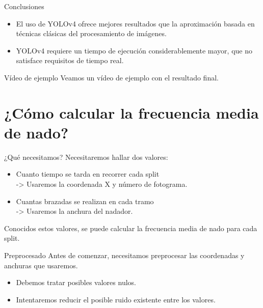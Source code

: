 \documentclass[11pt]{beamer}
\begin{document}
        \begin{frame}{Conclusiones}
            \begin{itemize}
                \item El uso de YOLOv4 ofrece mejores resultados que la aproximación basada en técnicas clásicas del procesamiento de imágenes.
                \item YOLOv4 requiere un tiempo de ejecución considerablemente mayor, que no satisface requisitos de tiempo real.
            \end{itemize}
        \end{frame}
        
        \begin{frame}{Vídeo de ejemplo}
            Veamos un vídeo de ejemplo con el resultado final.
    
        \end{frame}

    
    \section{¿Cómo calcular la frecuencia media de nado?}  
    
        \begin{frame}{¿Qué necesitamos?}
            Necesitaremos hallar dos valores:
            \begin{itemize}
                \item Cuanto tiempo se tarda en recorrer cada split \\ -> Usaremos la coordenada X y número de fotograma.
                \item Cuantas brazadas se realizan en cada tramo \\ -> Usaremos la anchura del nadador.
            \end{itemize}
            Conocidos estos valores, se puede calcular la frecuencia media de nado para cada split.
        \end{frame}
        
        \begin{frame}{Preprocesado}
            Antes de comenzar, necesitamos preprocesar las coordenadas y anchuras que usaremos.
            \begin{itemize}
                \item Debemos tratar posibles valores nulos.
                \item Intentaremos reducir el posible ruido existente entre los valores.
            \end{itemize}
        \end{frame}
        
\end{document}
